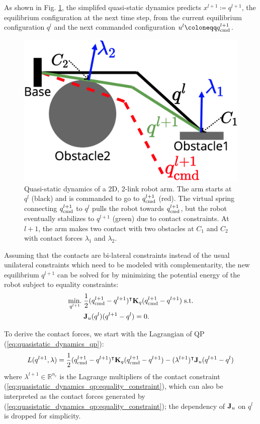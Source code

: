As shown in Fig. \ref{fig:quasistatic_dynamics}, the simplifed quasi-static dynamics predicts $x^{l+1} \coloneqq q^{l+1}$, the equilibrium configuration at the next time step, from the current equilibrium configuration $q^{l}$ and the next commanded configuration $u^l \coloneqq \qcmd[l+1]$.
\begin{figure}[h]
\centering
\includegraphics[width=0.5\linewidth]{figures/04_control/quasistatic_dynamics.png}
\caption{Quasi-static dynamics of a 2D, 2-link robot arm. The arm starts at $q^l$ (black) and is commanded to go to $\qcmd[l+1]$ (red). The virtual spring connecting $\qcmd[l+1]$ to $q^l$ pulls the robot towards $\qcmd[l+1]$, but the robot eventually stabilizes to $q^{l+1}$ (green) due to contact constraints. At $l+1$, the arm makes two contact with two obstacles at $C_1$ and $C_2$ with contact forces $\lambda_1$ and $\lambda_2$.}
\label{fig:quasistatic_dynamics}
\end{figure}

Assuming that the contacts are bi-lateral constraints instead of the usual unilateral constraints which need to be modeled with complementarity, the new equilibrium $q^{l+1}$ can be solved for by minimizing the potential energy of the robot subject to equality constraints:
\begin{subequations}
\label{eq:quasistatic_dynamics_qp}
\begin{align}
\underset{q^{l+1}}{\text{min.}} \; &\frac{1}{2}(\qcmd[l+1] - q^{l+1})^\intercal \mb{K}_q (\qcmd[l+1] - q^{l+1}) \; \text{s.t.} \\
& \J_u(q^l) (q^{l+1} - q^{l}) = 0. \label{eq:quasistatic_dynamics_qp:equality_constraint}
\end{align}
\end{subequations}

To derive the contact forces, we start with the Lagrangian of QP (\ref{eq:quasistatic_dynamics_qp}):
\begin{equation}
L(q^{l+1}, \lambda) = \frac{1}{2} (\qcmd[l+1] - q^{l+1})^\intercal \mb{K}_q (\qcmd[l+1] - q^{l+1}) - (\lambda^{l+1})^\intercal \J_u(q^{l+1} - q^l)
\end{equation}
where $\lambda^{l+1} \in \mathbb{R}^{n_c}$ is the Lagrange multipliers of the contact constraint (\ref{eq:quasistatic_dynamics_qp:equality_constraint}), which can also be interpreted as the contact forces generated by (\ref{eq:quasistatic_dynamics_qp:equality_constraint}); the dependency of $\J_u$ on $q^l$ is dropped for simplicity.

